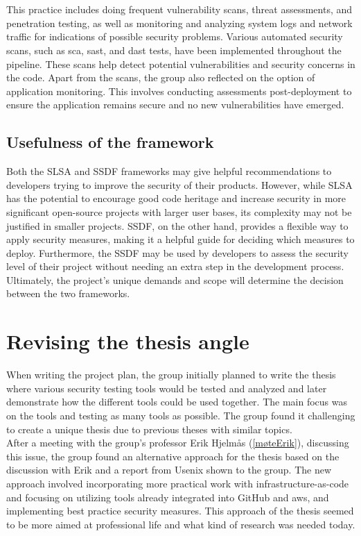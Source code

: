 \\~\\
This practice includes doing frequent vulnerability scans, threat assessments, and penetration testing, as well as monitoring and analyzing system logs and network traffic for indications of possible security problems. Various automated security scans, such as \acrshort{sca}, \acrshort{sast}, and \acrshort{dast} tests, have been implemented throughout the pipeline. These scans help detect potential vulnerabilities and security concerns in the code. Apart from the scans, the group also reflected on the option of application monitoring. This involves conducting assessments post-deployment to ensure the application remains secure and no new vulnerabilities have emerged.

\subsection{Usefulness of the framework}

Both the SLSA and SSDF frameworks may give helpful recommendations to developers trying to improve the security of their products. However, while SLSA has the potential to encourage good code heritage and increase security in more significant open-source projects with larger user bases, its complexity may not be justified in smaller projects. SSDF, on the other hand, provides a flexible way to apply security measures, making it a helpful guide for deciding which measures to deploy. Furthermore, the SSDF may be used by developers to assess the security level of their project without needing an extra step in the development process. Ultimately, the project's unique demands and scope will determine the decision between the two frameworks.

\section{Revising the thesis angle}
When writing the project plan, the group initially planned to write the thesis where various security testing tools would be tested and analyzed and later demonstrate how the different tools could be used together. The main focus was on the tools and testing as many tools as possible. The group found it challenging to create a unique thesis due to previous theses with similar topics. 
\\
After a meeting with the group's professor Erik Hjelmås  (\ref{møteErik}), discussing this issue, the group found an alternative approach for the thesis based on the discussion with Erik and a report from Usenix \cite{usenixreport} shown to the group. The new approach involved incorporating more practical work with infrastructure-as-code and focusing on utilizing tools already integrated into GitHub and \acrshort{aws}, and implementing best practice security measures. This approach of the thesis seemed to be more aimed at professional life and what kind of research was needed today.  


